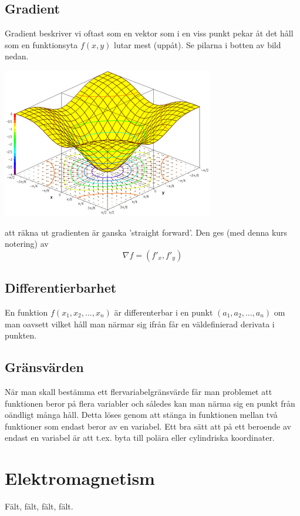 \documentclass[10pt,a4paper]{article}
\begin{document}
\subsection{Gradient}
Gradient beskriver vi oftast som en vektor som i en viss punkt pekar åt det håll som en funktionsyta $f(x,y)$ lutar mest (uppåt). Se pilarna i botten av bild nedan.
\begin{center}
\includegraphics[scale=0.5]{gradient}
\end{center}
att räkna ut gradienten är ganska 'straight forward'. Den ges (med denna kurs notering) av
\begin{equation}
\nabla f = (f'_x,f'_y)
\end{equation}

\subsection{Differentierbarhet}
En funktion $f(x_1,x_2,...,x_n)$ är differenterbar i en punkt $(a_1,a_2,...,a_n)$ om man oavsett vilket håll man närmar sig ifrån får en väldefinierad derivata i punkten.

\subsection{Gränsvärden}
När man skall bestämma ett flervariabelgränsvärde får man problemet att funktionen beror på flera variabler och således kan man närma sig en punkt från oändligt många håll. Detta löses genom att stänga in funktionen mellan två funktioner som endast beror av en variabel. Ett bra sätt att på ett beroende av endast en variabel är att t.ex. byta till polära eller cylindriska koordinater.

\section{Elektromagnetism}
Fält, fält, fält, fält.
\end{document}
